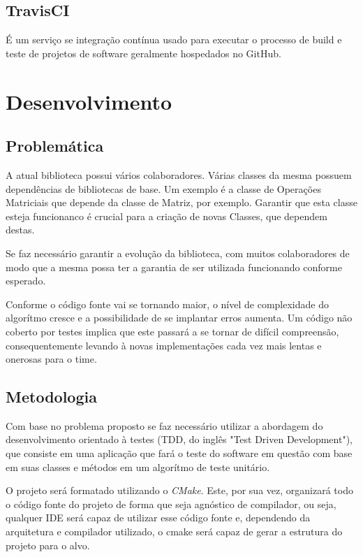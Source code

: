 \documentclass[
	article,			%
	12pt,				%
	oneside,			%
	a4paper,			%
	english,			%
	brazil,				%
	sumario=tradicional
	]{abntex2}
\begin{document}
\subsection{TravisCI}
É um serviço se integração contínua usado para executar o processo de build e teste de projetos de software geralmente hospedados no GitHub.


\section{Desenvolvimento}

\subsection{Problemática}

A atual biblioteca possui vários colaboradores. Várias classes da mesma possuem dependências de bibliotecas de base. Um exemplo é a classe de Operações Matriciais que depende da classe de Matriz, por exemplo. Garantir que esta classe esteja funcionanco é crucial para a criação de novas Classes, que dependem destas.

Se faz necessário garantir a evolução da biblioteca, com muitos colaboradores de modo que a mesma possa ter a garantia de ser utilizada funcionando conforme esperado.

Conforme o código fonte vai se tornando maior, o nível de complexidade do algorítmo cresce e a possibilidade de se implantar erros aumenta. Um código não coberto por testes implica que este passará a se tornar de difícil compreensão, consequentemente levando à novas implementações cada vez mais lentas e onerosas para o time.


\subsection{Metodologia}
Com base no problema proposto se faz necessário utilizar a abordagem do desenvolvimento orientado à testes (TDD, do inglês "Test Driven Development"), que consiste em uma aplicação que fará o teste do software em questão com base em suas classes e métodos em um algorítmo de teste unitário.

O projeto será formatado utilizando o \textit{CMake}. Este, por sua vez, organizará todo o código fonte do projeto de forma que seja agnóstico de compilador, ou seja, qualquer IDE será capaz de utilizar esse código fonte e, dependendo da arquitetura e compilador utilizado, o cmake será capaz de gerar a estrutura do projeto para o alvo. 
\end{document}
